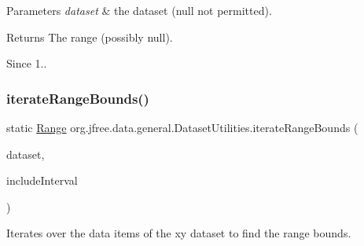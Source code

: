 \begin{DoxyParams}{Parameters}
{\em dataset} & the dataset ({\ttfamily null} not permitted).\\
\hline
\end{DoxyParams}
\begin{DoxyReturn}{Returns}
The range (possibly {\ttfamily null}).
\end{DoxyReturn}
\begin{DoxySince}{Since}
1.. 
\end{DoxySince}
\mbox{\label{classorg_1_1jfree_1_1data_1_1general_1_1_dataset_utilities_a61799a470b2eeaab266d942b23b71b97}} 
\subsubsection{\texorpdfstring{iterate\+Range\+Bounds()}{iterateRangeBounds()}\hspace{0.1cm}{\footnotesize\ttfamily [4/4]}}
{\footnotesize\ttfamily static \mbox{\hyperlink{classorg_1_1jfree_1_1data_1_1_range}{Range}} org.\+jfree.\+data.\+general.\+Dataset\+Utilities.\+iterate\+Range\+Bounds (\begin{DoxyParamCaption}\item[{\mbox{\hyperlink{interfaceorg_1_1jfree_1_1data_1_1xy_1_1_x_y_dataset}{X\+Y\+Dataset}}}]{dataset,  }\item[{boolean}]{include\+Interval }\end{DoxyParamCaption})\hspace{0.3cm}{\ttfamily [static]}}

Iterates over the data items of the xy dataset to find the range bounds.


